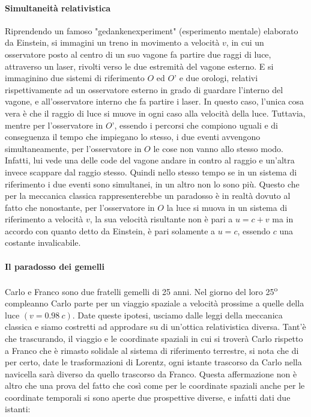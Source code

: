 \documentclass[a4paper,12pt]{report}
\begin{document}
\paragraph{Simultaneità relativistica}
Riprendendo  un famoso "gedankenexperiment" (esperimento mentale) elaborato da Einstein, si immagini un treno in movimento a velocità $v$, in cui un osservatore posto al centro di un suo vagone fa partire due raggi di luce, attraverso un laser, rivolti verso le due estremità del vagone esterno.
E si immaginino due sistemi di riferimento $O$ ed $O’$ e due orologi, relativi rispettivamente ad un osservatore esterno in grado di guardare l’interno del vagone, e all’osservatore interno che fa partire i laser.
In questo caso, l’unica cosa vera è che il raggio di luce si muove in ogni caso alla velocità della luce. Tuttavia, mentre per l’osservatore in $O’$, essendo i percorsi che compiono uguali e di conseguenza il tempo che impiegano lo stesso, i due eventi avvengono simultaneamente, per l’osservatore in $O$ le cose non vanno allo stesso modo. Infatti, lui vede una delle code del vagone andare in contro al raggio e un’altra invece scappare dal raggio stesso.  Quindi nello stesso tempo se in un sistema di riferimento i due eventi sono simultanei, in un altro non lo sono più. Questo che per la meccanica classica rappresenterebbe un paradosso è in realtà dovuto al fatto che nonostante, per l’osservatore in $O$ la luce si muova in un sistema di riferimento a velocità $v$, la sua velocità risultante non è pari a $u=c+v$ ma in accordo con quanto detto da Einstein, è pari solamente a $u=c$, essendo $c$ una costante invalicabile.

\paragraph{Il paradosso dei gemelli}
Carlo e Franco sono due fratelli gemelli di 25 anni. Nel giorno del loro 25\textsuperscript{o} compleanno Carlo parte per un viaggio spaziale a velocità prossime a quelle della luce $(v=0.98\:c)$. Date queste ipotesi, usciamo dalle leggi della meccanica classica e siamo costretti ad approdare su di un’ottica relativistica diversa. Tant’è che trascurando, il viaggio e le coordinate spaziali in cui si troverà Carlo rispetto a Franco che è rimasto solidale al sistema di riferimento terrestre, si nota che di per certo, date le trasformazioni di Lorentz, ogni istante trascorso da Carlo nella navicella sarà diverso da quello trascorso da Franco. Questa affermazione non è altro che una prova del fatto che così come per le coordinate spaziali anche per le coordinate temporali si sono aperte due prospettive  diverse, e infatti dati due istanti:
\end{document}
